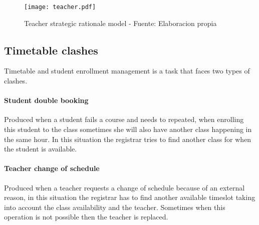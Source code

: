 \begin{figure}
	\centering
	\caption{Teacher strategic rationale model - Fuente: Elaboracion propia}
	\label{fig:actorBoundaryTeacher}
	\texttt{[image: teacher.pdf]}
\end{figure}

\subsection{Timetable clashes}
Timetable and student enrollment management is a task that faces two types of clashes.

\paragraph{Student double booking} Produced when a student fails a course and needs to repeated, when enrolling this student to the class sometimes she will also have another class happening in the same hour.
In this situation the registrar tries to find another class for when the student is available.

\paragraph{Teacher change of schedule} Produced when a teacher requests a change of schedule because of an external reason, in this situation the registrar has to find another available timeslot taking into account the class availability and the teacher.
Sometimes when this operation is not possible then the teacher is replaced.

